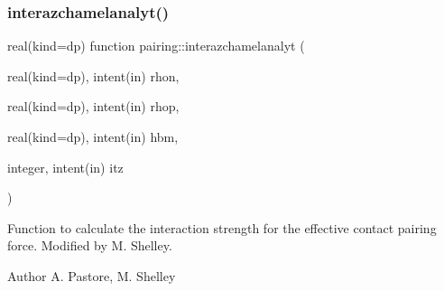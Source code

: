 \subsubsection{\texorpdfstring{interazchamelanalyt()}{interazchamelanalyt()}}
{\footnotesize\ttfamily real(kind=dp) function pairing\+::interazchamelanalyt (\begin{DoxyParamCaption}\item[{real(kind=dp), intent(in)}]{rhon,  }\item[{real(kind=dp), intent(in)}]{rhop,  }\item[{real(kind=dp), intent(in)}]{hbm,  }\item[{integer, intent(in)}]{itz }\end{DoxyParamCaption})}



Function to calculate the interaction strength for the effective contact pairing force. Modified by M. Shelley. 

\begin{DoxyAuthor}{Author}
A. Pastore, M. Shelley 
\end{DoxyAuthor}

